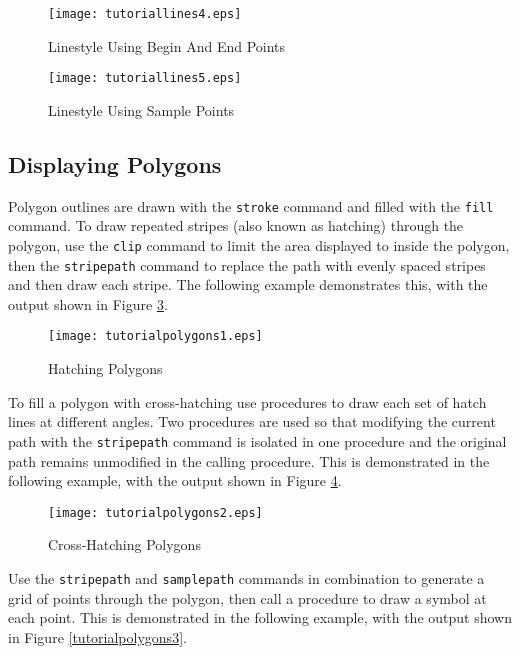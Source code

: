 

\begin{figure}[htb]
\texttt{[image: tutoriallines4.eps]}
\caption{Linestyle Using Begin And End Points}
\label{tutoriallines4}
\end{figure}



\begin{figure}[htb]
\texttt{[image: tutoriallines5.eps]}
\caption{Linestyle Using Sample Points}
\label{tutoriallines5}
\end{figure}

\subsection{Displaying Polygons}

Polygon outlines are drawn with the \texttt{stroke}
command and filled with the \texttt{fill} command.
To draw repeated stripes (also known as hatching) through
the polygon, use the \texttt{clip}
command to limit the area displayed to inside the polygon,
then the \texttt{stripepath}
command to replace the path with evenly spaced stripes and
then draw each stripe.  The following example demonstrates this,
with the output shown in Figure \ref{tutorialpolygons1}.



\begin{figure}[htb]
\texttt{[image: tutorialpolygons1.eps]}
\caption{Hatching Polygons}
\label{tutorialpolygons1}
\end{figure}

To fill a polygon with cross-hatching use procedures to
draw each set of hatch lines at different angles.  Two procedures
are used so that modifying the current path with the
\texttt{stripepath}
command is isolated in one procedure and the original path
remains unmodified in the calling procedure.
This is demonstrated in the following example, with the output
shown in Figure \ref{tutorialpolygons2}.



\begin{figure}[htb]
\texttt{[image: tutorialpolygons2.eps]}
\caption{Cross-Hatching Polygons}
\label{tutorialpolygons2}
\end{figure}

Use the \texttt{stripepath} and \texttt{samplepath}
commands in combination to generate a grid of points through the
polygon, then call a procedure to draw a symbol at each point.
This is demonstrated in the following example, with the output
shown in Figure \ref{tutorialpolygons3}.

